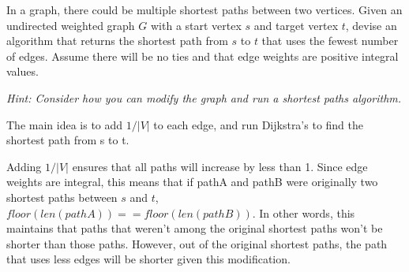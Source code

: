 \question 
In a graph, there could be multiple shortest paths between two vertices. Given an undirected weighted graph $G$ with a start vertex $s$ and target vertex $t$, devise an algorithm that returns the shortest path from $s$ to $t$ that uses the fewest number of edges. Assume there will be no ties and that edge weights are positive integral values.

\emph{Hint: Consider how you can modify the graph and run a shortest paths algorithm.}

\begin{solution}
The main idea is to add $1/|V|$ to each edge, and run Dijkstra's to find the shortest path from s to t.

Adding $1/|V|$ ensures that all paths will increase by less than 1. Since edge weights are integral, this means that if pathA and pathB were originally two shortest paths between $s$ and $t$, $floor(len(pathA)) == floor(len(pathB))$. In other words, this maintains that paths that weren't among the original shortest paths won't be shorter than those paths. However, out of the original shortest paths, the path that uses less edges will be shorter given this modification.

\end{solution}